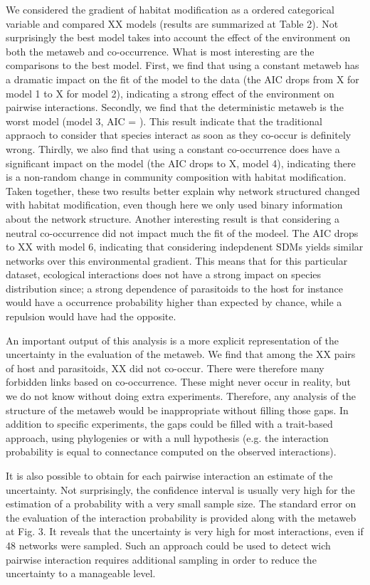 \documentclass[12pt]{article}
\begin{document}
We considered the gradient of habitat modification as a ordered categorical
variable and compared XX models (results are summarized at Table 2). Not
surprisingly the best model takes into account the effect of the environment on
both the metaweb and co-occurrence. What is most interesting are the comparisons
to the best model. First, we find that using a constant metaweb has a dramatic
impact on the fit of the model to the data (the AIC drops from X for model 1 to
X for model 2), indicating a strong effect of the environment on pairwise
interactions. Secondly, we find that the deterministic metaweb is the worst
model (model 3, AIC = ). This result indicate that the traditional appraoch to
consider that species interact as soon as they co-occur is definitely wrong.
Thirdly, we also find that using a constant co-occurrence does have a
significant impact on the model (the AIC drops to X, model 4), indicating there
is a non-random change in community composition with habitat modification. Taken
together, these two results better explain why network structured changed with
habitat modification, even though here we only used binary information about the
network structure. Another interesting result is that considering a neutral
co-occurrence did not impact much the fit of the modeel. The AIC drops to XX
with model 6, indicating that considering indepdenent SDMs yields similar
networks over this environmental gradient. This means that for this particular
dataset, ecological interactions does not have a strong impact on species
distribution since; a strong dependence of parasitoids to the host for instance
would have a occurrence probability higher than expected by chance, while a
repulsion would have had the opposite.

An important output of this analysis is a more explicit representation of the
uncertainty in the evaluation of the metaweb. We find that among the XX pairs of
host and parasitoids, XX did not co-occur. There were therefore many forbidden
links based on co-occurrence. These might never occur in reality, but we do not
know without doing extra experiments. Therefore, any analysis of the structure
of the metaweb would be inappropriate without filling those gaps. In addition to
specific experiments, the gaps could be filled with a trait-based approach,
using phylogenies or with a null hypothesis (e.g. the interaction probability is
equal to connectance computed on the observed interactions).

It is also possible to obtain for each pairwise interaction an estimate of the
uncertainty. Not surprisingly, the confidence interval is usually very high for
the estimation of a probability with a very small sample size. The standard
error on the evaluation of the interaction probability is provided along with
the metaweb at Fig. 3. It reveals that the uncertainty is very high for most
interactions, even if 48 networks were sampled. Such an approach could be used
to detect wich pairwise interaction requires additional sampling in order to
reduce the uncertainty to a manageable level.
  
\end{document}
